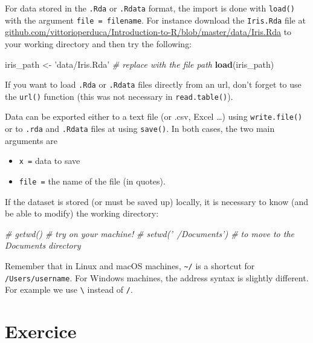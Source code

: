 \documentclass[]{book}
\newenvironment{Shaded}{\begin{snugshade}}{\end{snugshade}}
\newcommand{\CommentTok}[1]{\textcolor[rgb]{0.56,0.35,0.01}{\textit{#1}}}
\newcommand{\KeywordTok}[1]{\textcolor[rgb]{0.13,0.29,0.53}{\textbf{#1}}}
\newcommand{\NormalTok}[1]{#1}
\newcommand{\StringTok}[1]{\textcolor[rgb]{0.31,0.60,0.02}{#1}}
\providecommand{\tightlist}{%
  \setlength{\itemsep}{0pt}\setlength{\parskip}{0pt}}
\begin{document}
For data stored in the \texttt{.Rda} or \texttt{.Rdata} format, the import is done with \texttt{load()} with the argument \texttt{file\ =\ filename}. For instance download the \texttt{Iris.Rda} file at \href{https://github.com/vittorioperduca/Introduction-to-R/blob/master/data/Iris.Rda}{github.com/vittorioperduca/Introduction-to-R/blob/master/data/Iris.Rda} to your working directory and then try the following:

\begin{Shaded}
\begin{Highlighting}[]
\NormalTok{iris_path <-}\StringTok{ 'data/Iris.Rda'} \CommentTok{# replace with the file path}
\KeywordTok{load}\NormalTok{(iris_path)}
\end{Highlighting}
\end{Shaded}

If you want to load \texttt{.Rda} or \texttt{.Rdata} files directly from an url, don't forget to use the \texttt{url()} function (this was not necessary in \texttt{read.table()}).

Data can be exported either to a text file (or .csv, Excel \ldots{}) using \texttt{write.file()} or to \texttt{.rda} and \texttt{.Rdata} files at using \texttt{save()}. In both cases, the two main arguments are

\begin{itemize}
\tightlist
\item
  \texttt{x\ =} data to save
\item
  \texttt{file\ =} the name of the file (in quotes).
\end{itemize}

If the dataset is stored (or must be saved up) locally, it is necessary to know (and be able to modify) the working directory:

\begin{Shaded}
\begin{Highlighting}[]
\CommentTok{# getwd() # try on your machine!}
\CommentTok{# setwd('~/Documents') # to move to the Documents directory}
\end{Highlighting}
\end{Shaded}

Remember that in Linux and macOS machines, \texttt{\textasciitilde{}/} is a shortcut for \texttt{/Users/username}. For Windows machines, the address syntax is slightly different. For example we use \texttt{\textbackslash{}} instead of \texttt{/}.

\hypertarget{exercice}{%
\section{Exercice}\label{exercice}}
\end{document}
